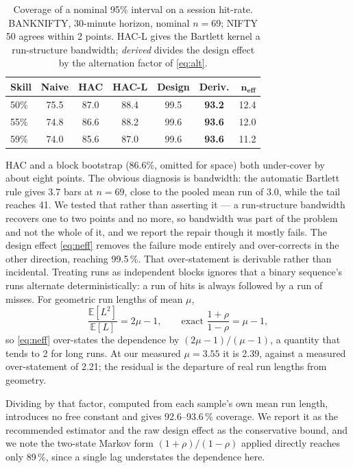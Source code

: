 \documentclass[sigconf,nonacm]{acmart}
\begin{document}
\begin{table}[t]
\caption{Coverage of a nominal 95\% interval on a session hit-rate. BANKNIFTY,
30-minute horizon, nominal $n=69$; NIFTY 50 agrees within 2 points. HAC-L gives
the Bartlett kernel a run-structure bandwidth; \emph{derived} divides the design
effect by the alternation factor of \eqref{eq:alt}.}
\label{tab:cov}
\small
\begin{tabular}{@{}lcccccr@{}}
\toprule
\textbf{Skill} & \textbf{Naive} & \textbf{HAC} & \textbf{HAC-L} &
\textbf{Design} & \textbf{Deriv.} & $\boldsymbol{n_{\text{eff}}}$ \\
\midrule
50\% & 75.5 & 87.0 & 88.4 & 99.5 & \textbf{93.2} & 12.4 \\
55\% & 74.8 & 86.6 & 88.2 & 99.6 & \textbf{93.6} & 12.0 \\
59\% & 74.0 & 85.6 & 87.0 & 99.6 & \textbf{93.6} & 11.2 \\
\bottomrule
\end{tabular}
\end{table}

HAC and a block bootstrap (86.6\%, omitted for space) both under-cover by about
eight points. The obvious diagnosis is bandwidth: the automatic Bartlett rule
gives 3.7 bars at $n=69$, close to the pooled mean run of 3.0, while the tail
reaches 41. We tested that rather than asserting it --- a run-structure
bandwidth recovers one to two points and no more, so bandwidth was part of the
problem and not the whole of it, and we report the repair though it mostly
fails. The design effect \eqref{eq:neff} removes the failure mode entirely and
over-corrects in the other direction, reaching 99.5\,\%. That over-statement is
derivable rather than incidental. Treating runs as independent blocks ignores
that a binary sequence's runs alternate deterministically: a run of hits is
always followed by a run of misses. For geometric run lengths of mean $\mu$,
\begin{equation}
\frac{\mathbb{E}[L^2]}{\mathbb{E}[L]} = 2\mu - 1,
\qquad
\text{exact } \frac{1+\rho}{1-\rho} = \mu - 1,
\label{eq:alt}
\end{equation}
so \eqref{eq:neff} over-states the dependence by $(2\mu-1)/(\mu-1)$, a quantity
that tends to 2 for long runs. At our measured $\mu = 3.55$ it is 2.39, against
a measured over-statement of 2.21; the residual is the departure of real run
lengths from geometry.

Dividing by that factor, computed from each sample's own mean run length,
introduces no free constant and gives 92.6--93.6\,\% coverage. We report it as
the recommended estimator and the raw design effect as the conservative bound,
and we note the two-state Markov form $(1+\rho)/(1-\rho)$ applied directly
reaches only 89\,\%, since a single lag understates the dependence here.
\end{document}
